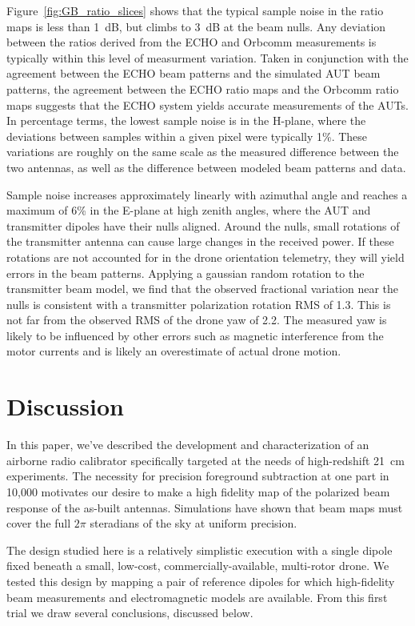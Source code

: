 \documentclass[preprint2,numberedappendix,tighten,twocolappendix]{aastex6}
\begin{document}
Figure~\ref{fig:GB_ratio_slices} shows that the typical sample noise in the ratio maps is less than 1~dB, but climbs to 3~dB at the beam nulls.  Any deviation between the ratios derived from the ECHO and Orbcomm measurements is typically within this level of measurment variation.  Taken in conjunction with the agreement between the ECHO beam patterns and the simulated AUT beam patterns, the agreement between the ECHO ratio maps and the Orbcomm ratio maps suggests that the ECHO system yields accurate measurements of the AUTs.  In percentage terms, the lowest sample noise is in the H-plane, where the deviations between samples within a given pixel were typically 1\%. These variations are roughly on the same scale as the measured difference between the two antennas, as well as the difference between modeled beam patterns and data.  

Sample noise increases approximately linearly with azimuthal angle and reaches a maximum of 6\% in the E-plane at high zenith angles, where the AUT and transmitter dipoles have their nulls aligned.  Around the nulls, small rotations of the transmitter antenna can cause large changes in the received power.  If these rotations are not accounted for in the drone orientation telemetry, they will yield errors in the beam patterns.  Applying a gaussian random rotation to the transmitter beam model, we find that the observed fractional variation near the nulls is consistent with a transmitter polarization  rotation RMS of 1.3\arcdeg{}.  This is not far from the observed RMS of the drone yaw of 2.2\arcdeg{}.  The measured yaw is likely to be influenced by other errors such as magnetic interference from the motor currents and is likely an overestimate of actual drone motion.



\section{Discussion}
\label{sec:conclusion}

In this paper, we've described the development and characterization of an airborne radio calibrator specifically targeted at the needs of high-redshift 21~cm experiments. The necessity for precision foreground subtraction at one part in 10,000 motivates our desire to make a high fidelity map of the polarized beam response of the as-built antennas. Simulations have shown that beam maps must cover the full $2\pi$ steradians of the sky at uniform precision. 

The design studied here is a relatively simplistic execution with a single dipole fixed beneath a small, low-cost, commercially-available, multi-rotor drone.  We tested this design by mapping a pair of reference dipoles for which high-fidelity beam measurements and electromagnetic models are available.   From this first trial we draw several conclusions, discussed below.
\end{document}
